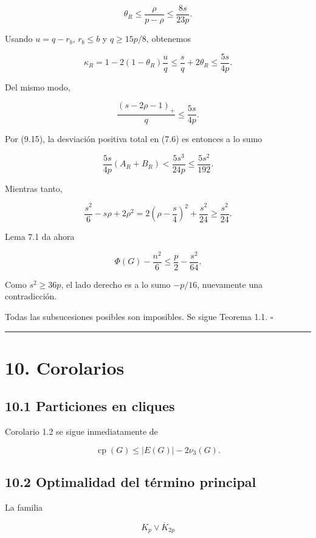 \documentclass[spanish,11pt,a4paper]{article}
\begin{document}
\[
\theta_R
\le
\frac{\rho}{p-\rho}
\le
\frac{8s}{23p}.
\]

Usando \(u=q-r_b\), \(r_b\le b\) y \(q\ge15p/8\), obtenemos

\[
\kappa_R
=1-2(1-\theta_R)\frac uq
\le
\frac sq+2\theta_R
\le
\frac{5s}{4p}.
\tag{9.16}
\]

Del mismo modo,

\[
\frac{(s-2\rho-1)_+}{q}
\le
\frac{5s}{4p}.
\tag{9.17}
\]

Por (9.15), la desviación positiva total en (7.6) es entonces a lo sumo

\[
\frac{5s}{4p}(A_R+B_R)
<
\frac{5s^3}{24p}
\le
\frac{5s^2}{192}.
\tag{9.18}
\]

Mientras tanto,

\[
\frac{s^2}{6}-s\rho+2\rho^2
=
2\left(\rho-\frac s4\right)^2+\frac{s^2}{24}
\ge
\frac{s^2}{24}.
\tag{9.19}
\]

Lema 7.1 da ahora

\[
\Phi(G)-\frac{n^2}{6}
\le
\frac p2-\frac{s^2}{64}.
\tag{9.20}
\]

Como \(s^2\ge36p\), el lado derecho es a lo sumo \(-p/16\), nuevamente
una contradicción.

Todas las subsucesiones posibles son imposibles. Se sigue Teorema 1.1.
\(\square\)

\begin{center}\rule{0.5\linewidth}{0.5pt}\end{center}

\section{10. Corolarios}\label{corolarios}

\subsection{10.1 Particiones en cliques}\label{particiones-en-cliques}

Corolario 1.2 se sigue inmediatamente de

\[
\operatorname{cp}(G)
\le
|E(G)|-2\nu_3(G).
\]

\subsection{10.2 Optimalidad del término
principal}\label{optimalidad-del-tuxe9rmino-principal}

La familia

\[
K_p\vee\overline K_{2p}
\]
\end{document}
